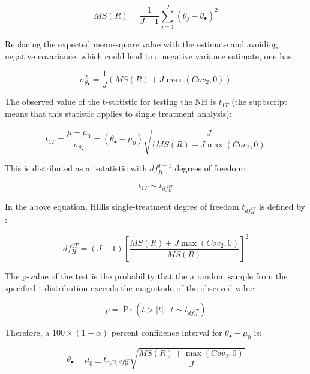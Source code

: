 \documentclass[
]{book}
\begin{document}
\begin{equation}
MS(R)=\frac{1}{J-1}\sum_{j=1}^{J}(\theta_j - \theta_{\bullet})^2
\label{eq:EstMsR1T}
\end{equation}

Replacing the expected mean-square value with the estimate and avoiding negative covariance, which could lead to a negative variance estimate, one has:

\begin{equation}
\sigma_{\theta_{\bullet}}^{2}=\frac{1}{J}(MS(R)+J\max(Cov_2,0))
\label{eq:EstVarThetaDot}
\end{equation}

The observed value of the t-statistic for testing the NH is \(t_{1T}\) (the supbscript means that this statistic applies to single treatment analysis):

\begin{equation}
t_{1T}=\frac{\mu-\mu_0}{\sigma_{\theta_{\bullet}}}=(\theta_{\bullet}-\mu_0)\sqrt{\frac{J}{(MS(R)+J\max(Cov_2,0)}}
\label{eq:DefTStat1T}
\end{equation}

This is distributed as a t-statistic with \(df_{H}^{I=1}\) degrees of freedom:

\begin{equation}
t_{1T} \sim t_{df_{H}^{1T}}
\label{eq:DistTStat1T}
\end{equation}

In the above equation, Hillis single-treatment degree of freedom \(t_{df_{H}^{1T}}\) is defined by \citep{RN2508}:

\begin{equation}
df_{H}^{1T}=(J-1)\left [\frac{MS(R)+J \max(Cov_2,0)}{MS(R)} \right ]^2
\label{eq:DefdfHI1}
\end{equation}

The p-value of the test is the probability that the a random sample from the specified t-distribution exceeds the magnitude of the observed value:

\begin{equation}
p=\Pr(t>\left | t \right |\mid t \sim t_{df_{H}^{1T}})
\label{eq:pValue1T}
\end{equation}

Therefore, a \(100 \times (1-\alpha)\) percent confidence interval for \(\theta_{\bullet}-\mu_0\) is:

\begin{equation}
\theta_{\bullet}-\mu_0 \pm t_{\alpha/2,df_{H}^{1T}} \sqrt{ \frac{MS(R)+\max(Cov_2,0)}{J}}
\label{eq:CIalpha1T}
\end{equation}
\end{document}
